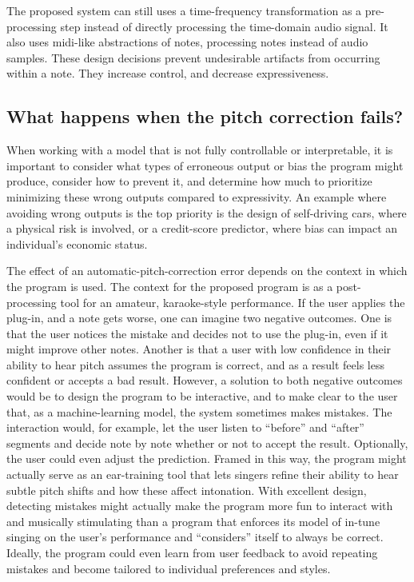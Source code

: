 The proposed system can still uses a time-frequency transformation as a pre-processing step instead of directly processing the time-domain audio signal. It also uses \gls{midi}-like abstractions of notes, processing notes instead of audio samples. These design decisions prevent undesirable artifacts from occurring within a note. They increase control, and decrease expressiveness. 

\subsection{What happens when the pitch correction fails?}
When working with a model that is not fully controllable or interpretable, it is important to consider what types of erroneous output or bias the program might produce, consider how to prevent it, and determine how much to prioritize minimizing these wrong outputs compared to expressivity. An example where avoiding wrong outputs is the top priority is the design of self-driving cars, where a physical risk is involved, or a credit-score predictor, where bias can impact an individual's economic status. 

The effect of an automatic-pitch-correction error depends on the context in which the program is used. The context for the proposed program is as a post-processing tool for an amateur, karaoke-style performance. If the user applies the plug-in, and a note gets worse, one can imagine two negative outcomes. One is that the user notices the mistake and decides not to use the plug-in, even if it might improve other notes. Another is that a user with low confidence in their ability to hear pitch assumes the program is correct, and as a result feels less confident or accepts a bad result. However, a solution to both negative outcomes would be to design the program to be interactive, and to make clear to the user that, as a machine-learning model, the system sometimes makes mistakes. The interaction would, for example, let the user listen to ``before'' and ``after'' segments and decide note by note whether or not to accept the result. Optionally, the user could even adjust the prediction. Framed in this way, the program might actually serve as an ear-training tool that lets singers refine their ability to hear subtle pitch shifts and how these affect intonation. With excellent design, detecting mistakes might actually make the program more fun to interact with and musically stimulating than a program that enforces its model of in-tune singing on the user's performance and ``considers'' itself to always be correct. Ideally, the program could even learn from user feedback to avoid repeating mistakes and become tailored to individual preferences and styles.

